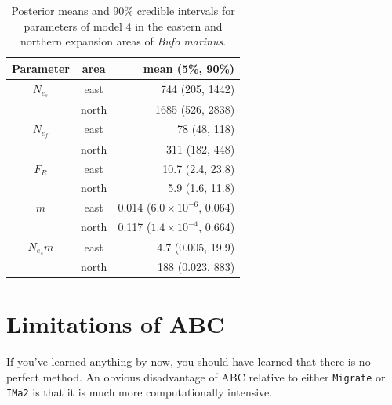 \begin{table}
\begin{center}
\begin{tabular}{ccr}
\hline\hline
Parameter & area & mean (5\%, 90\%) \\
\hline
$N_{e_s}$ & east & 744 (205, 1442) \\
         & north & 1685 (526, 2838) \\
$N_{e_f}$ & east & 78 (48, 118) \\
         & north & 311 (182, 448) \\
$F_R$    & east & 10.7 (2.4, 23.8) \\
         & north & 5.9 (1.6, 11.8) \\
$m$      & east & 0.014 ($6.0 \times 10^{-6}$, 0.064) \\
         & north & 0.117 ($1.4 \times 10^{-4}$, 0.664) \\
$N_{e_s}m$ & east & 4.7 (0.005, 19.9) \\
          & north & 188 (0.023, 883) \\
\hline
\end{tabular}
\end{center}
\caption{Posterior means and 90\% credible intervals for parameters of
  model 4 in the eastern and northern expansion areas of {\it Bufo
    marinus}.}\label{table:cane-toad}
\end{table}

\section*{Limitations of ABC}

If you've learned anything by now, you should have learned that there
is no perfect method. An obvious disadvantage of ABC relative to
either {\tt Migrate} or {\tt IMa2} is that it is much more
computationally intensive. 

